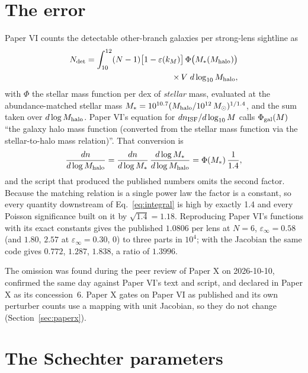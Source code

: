 \documentclass[twocolumn,11pt]{article}
\newcommand{\Msun}{M_\odot}
\newcommand{\einf}{\varepsilon_\infty}
\newcommand{\Ndet}{N_{\rm det}}
\begin{document}
\section{The error}
\label{sec:error}

Paper VI \citep{paper6} counts the detectable other-branch galaxies
per strong-lens sightline as
\begin{equation}
\begin{split}
\Ndet=\int_{10}^{12}(N-1)\bigl[1-\varepsilon(k_M)\bigr]\,
\Phi\bigl(M_\ast(M_{\rm halo})\bigr)\\
\times\,V\;d\log_{10}M_{\rm halo},
\end{split}
\label{eq:integral}
\end{equation}
with $\Phi$ the stellar mass function per dex of \emph{stellar} mass,
evaluated at the abundance-matched stellar mass
$M_\ast=10^{10.7}(M_{\rm halo}/10^{12}\,\Msun)^{1/1.4}$, and the sum
taken over $d\log M_{\rm halo}$. Paper VI's equation for $dn_{\rm ISF}/d\log_{10}M$ calls
$\Phi_{\rm gal}(M)$ ``the galaxy halo mass function (converted from
the stellar mass function via the stellar-to-halo mass relation)''.
That conversion is
\begin{equation}
\frac{dn}{d\log M_{\rm halo}}=\frac{dn}{d\log M_\ast}\,
\frac{d\log M_\ast}{d\log M_{\rm halo}}
=\Phi(M_\ast)\,\frac{1}{1.4},
\end{equation}
and the script that produced the published numbers omits the second
factor. Because the matching relation is a single power law the factor
is a constant, so every quantity downstream of Eq.~\ref{eq:integral}
is high by exactly 1.4 and every Poisson significance built on it by
$\sqrt{1.4}=1.18$. Reproducing Paper VI's functions with its exact
constants gives the published $1.0806$ per lens at $N=6$,
$\einf=0.58$ (and $1.80$, $2.57$ at $\einf=0.30$, $0$) to three parts
in $10^4$; with the Jacobian the same code gives $0.772$, $1.287$,
$1.838$, a ratio of $1.3996$.

The omission was found during the peer review of Paper X
\citep{paper10} on 2026-10-10, confirmed the same day against Paper
VI's text and script, and declared in Paper X as its concession~6.
Paper X gates on Paper VI as published and its own perturber counts use
a mapping with unit Jacobian, so they do not change (Section~\ref{sec:paperx}).

\section{The Schechter parameters}
\label{sec:schechter}
\end{document}
